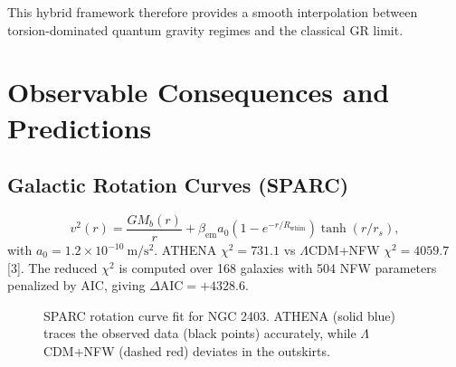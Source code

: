 \documentclass[12pt, a4paper]{article}
\begin{document}
This hybrid framework therefore provides a smooth interpolation between torsion-dominated quantum gravity regimes and the classical GR limit.

\section{Observable Consequences and Predictions}
\label{sec:obs}

\subsection{Galactic Rotation Curves (SPARC)}
\begin{equation}
v^2(r) = \frac{G M_b(r)}{r} + \beta_{\mathrm{em}} a_0 \left(1 - e^{-r/R_{\mathrm{whim}}}\right) \tanh(r/r_s),
\label{eq:rotcurve}
\end{equation}
with $a_0 = 1.2 \times 10^{-10}\ \mathrm{m/s^2}$. ATHENA $\chi^2 = 731.1$ vs $\Lambda$CDM+NFW $\chi^2 = 4059.7$ [3]. The reduced $\chi^2$ is computed over 168 galaxies with 504 NFW parameters penalized by AIC, giving $\Delta \mathrm{AIC} = +4328.6$.

\begin{figure}[htbp]
\centering
{}
\caption{SPARC rotation curve fit for NGC 2403. ATHENA (solid blue) traces the observed data (black points) accurately, while $\Lambda$CDM+NFW (dashed red) deviates in the outskirts.}
\label{fig:sparc_fit}
\end{figure}
\end{document}
